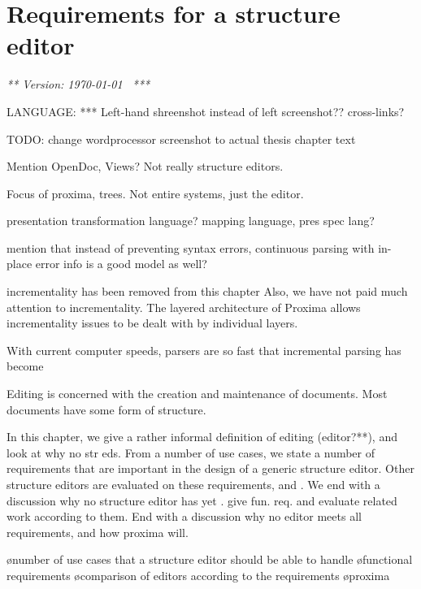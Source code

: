 \chapter{Requirements for a structure editor} %
\label{chap:requirements}

{\em *** Version: \today~ ***}

\bc

LANGUAGE:
*** Left-hand shreenshot instead of left screenshot??
cross-links?

TODO: change wordprocessor screenshot to actual thesis chapter text


Mention OpenDoc, Views? Not really structure editors.

Focus of proxima, trees. Not entire systems, just the editor.

presentation transformation language? mapping language, pres spec lang?

mention that instead of preventing syntax errors, continuous parsing with in-place error 
info is a good model as well?

incrementality  has been removed from this chapter
Also, we have not paid much attention to incrementality. The layered architecture of Proxima allows incrementality issues to be dealt with by individual layers. 

With current computer speeds, parsers are so fast that incremental parsing has become %
\ec

\bc
Editing is concerned with the creation and maintenance of documents.  
Most documents have some form of structure. 

In this chapter, we give a rather informal definition of editing (editor?**), and look at why no str eds. From a number of use cases, we state a number of requirements that are important in the design of a generic structure editor. Other structure editors are evaluated on these requirements, and . We end with a discussion why no structure editor has yet .  give fun. req. and evaluate related work according to them. End with a discussion why no editor meets all requirements, and how proxima will.
\ec

\bl
\o number of use cases that a structure editor should be able to handle
\o functional requirements
\o comparison of editors according to the requirements
\o proxima
\el



